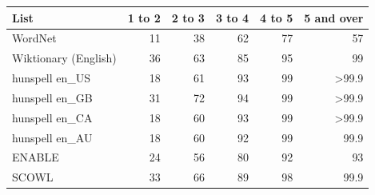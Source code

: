 \begin{tabular}{lrrrrr}
\toprule
List & 1 to 2 & 2 to 3 & 3 to 4 & 4 to 5 & 5 and over \\
\midrule
WordNet & 11 & 38 & 62 & 77 & 57 \\
Wiktionary (English) & 36 & 63 & 85 & 95 & 99 \\
hunspell en\_US & 18 & 61 & 93 & 99 & >99.9 \\
hunspell en\_GB & 31 & 72 & 94 & 99 & >99.9 \\
hunspell en\_CA & 18 & 60 & 93 & 99 & >99.9 \\
hunspell en\_AU & 18 & 60 & 92 & 99 & 99.9 \\
ENABLE & 24 & 56 & 80 & 92 & 93 \\
SCOWL & 33 & 66 & 89 & 98 & 99.9 \\
\bottomrule
\end{tabular}
